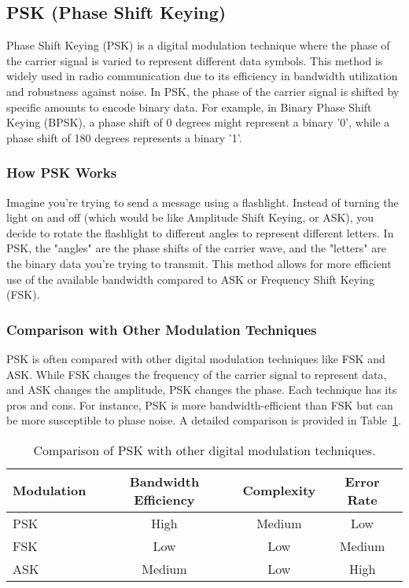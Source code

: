 \subsection{PSK (Phase Shift Keying)}
\label{subsec:psk-digital}

Phase Shift Keying (PSK) is a digital modulation technique where the phase of the carrier signal is varied to represent different data symbols. This method is widely used in radio communication due to its efficiency in bandwidth utilization and robustness against noise. In PSK, the phase of the carrier signal is shifted by specific amounts to encode binary data. For example, in Binary Phase Shift Keying (BPSK), a phase shift of 0 degrees might represent a binary '0', while a phase shift of 180 degrees represents a binary '1'. 

\subsubsection*{How PSK Works}
Imagine you're trying to send a message using a flashlight. Instead of turning the light on and off (which would be like Amplitude Shift Keying, or ASK), you decide to rotate the flashlight to different angles to represent different letters. In PSK, the "angles" are the phase shifts of the carrier wave, and the "letters" are the binary data you're trying to transmit. This method allows for more efficient use of the available bandwidth compared to ASK or Frequency Shift Keying (FSK).

\subsubsection*{Comparison with Other Modulation Techniques}
PSK is often compared with other digital modulation techniques like FSK and ASK. While FSK changes the frequency of the carrier signal to represent data, and ASK changes the amplitude, PSK changes the phase. Each technique has its pros and cons. For instance, PSK is more bandwidth-efficient than FSK but can be more susceptible to phase noise. A detailed comparison is provided in Table~\ref{tab:modulation-comparison}.

\begin{table}[h]
\centering
\caption{Comparison of PSK with other digital modulation techniques.}
\label{tab:modulation-comparison}
\begin{tabular}{|l|c|c|c|}
\hline
\textbf{Modulation} & \textbf{Bandwidth Efficiency} & \textbf{Complexity} & \textbf{Error Rate} \\
\hline
PSK & High & Medium & Low \\
FSK & Low & Low & Medium \\
ASK & Medium & Low & High \\
\hline
\end{tabular}
\end{table}

